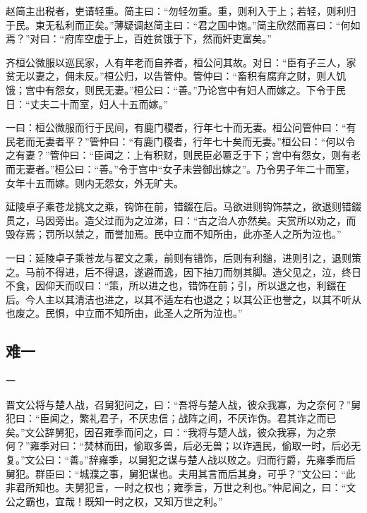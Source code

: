 \documentclass[]{article}
\begin{document}
赵简主出税者，吏请轻重。简主曰：``勿轻勿重。重，则利入于上；若轻，则利归于民。束无私利而正矣。''薄疑调赵简主曰：``君之国中饱。''简主欣然而喜曰：``何如焉？''对曰：``府库空虚于上，百姓贫饿于下，然而奸吏富矣。''

齐桓公微服以巡民家，人有年老而自养者，桓公问其故。对日：``臣有子三人，家贫无以妻之，佣未反。''桓公归，以告管仲。管仲曰：``畜积有腐弃之财，则人饥饿；宫中有怨女，则民无妻。''桓公曰：``善。''乃论宫中有妇人而嫁之。下令于民日：``丈夫二十而室，妇人十五而嫁。''

一曰：桓公微服而行于民间，有鹿门稷者，行年七十而无妻。桓公问管仲曰：``有民老而无妻者平？''管仲曰：``有鹿门稷者，行年七十矣而无妻。''桓公曰：``何以令之有妻？''管仲曰：``臣闻之：上有积财，则民臣必匾乏于下；宫中有怨女，则有老而无妻者。''桓公曰：``善。''令于宫中``女子未尝御出嫁之''。乃令男子年二十而室，女年十五而嫁。则内无怨女，外无旷夫。

延陵卓子乘苍龙挑文之乘，钩饰在前，错錣在后。马欲进则钩饰禁之，欲退则错錣贯之，马因旁出。造父过而为之泣涕，曰：``古之治人亦然矣。夫赏所以劝之，而毁存焉；罚所以禁之，而誉加焉。民中立而不知所由，此亦圣人之所为泣也。''

一曰：延陵卓子乘苍龙与翟文之乘，前则有错饰，后则有利鎚，进则引之，退则策之。马前不得进，后不得退，遂避而逸，因下抽刀而刎其脚。造父见之，泣，终日不食，因仰天而叹曰：``策，所以进之也，错饰在前；引，所以退之也，利錣在后。今人主以其清洁也进之，以其不适左右也退之；以其公正也誉之，以其不听从也废之。民惧，中立而不知所由，此圣人之所为泣也。''

\hypertarget{header-n1488}{%
\subsection{难一}\label{header-n1488}}

一

晋文公将与楚人战，召舅犯问之，曰：``吾将与楚人战，彼众我寡，为之奈何？''舅犯曰：``臣闻之，繁礼君子，不厌忠信；战阵之间，不厌诈伪。君其诈之而已矣。''文公辞舅犯，因召雍季而问之，曰：``我将与楚人战，彼众我寡，为之奈何？''雍季对曰：``焚林而田，偷取多兽，后必无兽；以诈遇民，偷取一时，后必无复。''文公曰：``善。''辞雍季，以舅犯之谋与楚人战以败之。归而行爵，先雍季而后舅犯。群臣曰：``城濮之事，舅犯谋也。夫用其言而后其身，可乎？''文公曰：``此非君所知也。夫舅犯言，一时之权也；雍季言，万世之利也。''仲尼闻之，曰：``文公之霸也，宜哉！既知一时之权，又知万世之利。''
\end{document}
